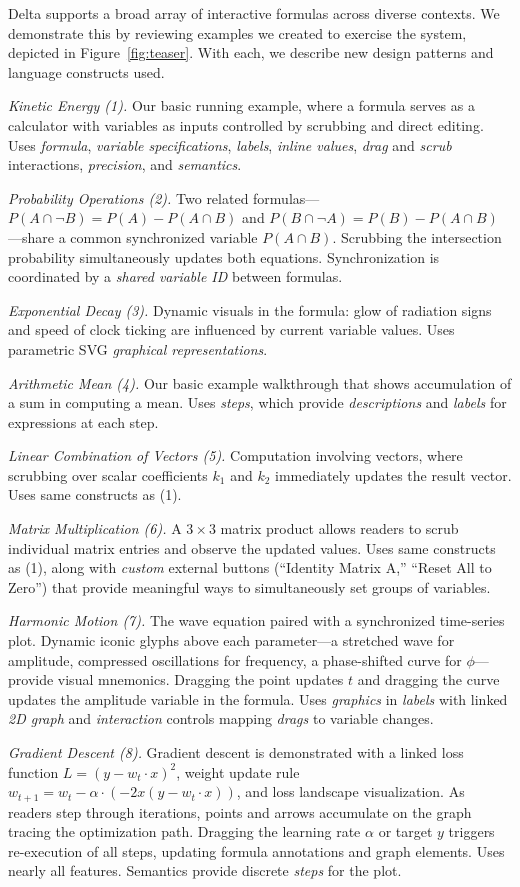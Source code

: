 Delta supports a broad array of interactive formulas across diverse contexts. We demonstrate this by reviewing examples we created to exercise the system, depicted in Figure~\ref{fig:teaser}. With each, we describe new design patterns and language constructs used.

\medskip

\emph{Kinetic Energy (1).} Our basic running example, where a formula serves as a calculator with variables as inputs controlled by scrubbing and direct editing. Uses \emph{formula}, \emph{variable specifications}, \emph{labels}, \emph{inline values}, \emph{drag} and \emph{scrub} interactions, \emph{precision}, and \emph{semantics}.

\emph{Probability Operations (2).} Two related formulas---$P(A \cap \neg B) = P(A) - P(A \cap B)$ and $P(B \cap \neg A) = P(B) - P(A \cap B)$---share a common synchronized variable $P(A \cap B)$. Scrubbing the intersection probability simultaneously updates both equations. Synchronization is coordinated by a \emph{shared variable ID} between formulas. 

\emph{Exponential Decay (3).} Dynamic visuals in the formula: glow of radiation signs and speed of clock ticking are influenced by current variable values. Uses parametric SVG \emph{graphical representations}.

\emph{Arithmetic Mean (4).} Our basic example walkthrough that shows accumulation of a sum in computing a mean. Uses \emph{steps}, which provide \emph{descriptions} and \emph{labels} for expressions at each step.

\emph{Linear Combination of Vectors (5).} Computation involving vectors, where scrubbing over scalar coefficients $k_1$ and $k_2$ immediately updates the result vector. Uses same constructs as (1).

\emph{Matrix Multiplication (6).} A $3 \times 3$ matrix product allows readers to scrub individual matrix entries and observe the updated values. Uses same constructs as (1), along with \emph{custom} external buttons (``Identity Matrix A,'' ``Reset All to Zero'') that provide meaningful ways to simultaneously set groups of variables.

\emph{Harmonic Motion (7).} The wave equation paired with a synchronized time-series plot. Dynamic iconic glyphs above each parameter---a stretched wave for amplitude, compressed oscillations for frequency, a phase-shifted curve for $\phi$---provide visual mnemonics. Dragging the point updates $t$ and dragging the curve updates the amplitude variable in the formula. Uses \emph{graphics} in \emph{labels} with linked \emph{2D graph} and \emph{interaction} controls mapping \emph{drags} to variable changes.

\emph{Gradient Descent (8).} Gradient descent is demonstrated with a linked loss function $L = (y - w_t \cdot x)^2$, weight update rule $w_{t+1} = w_t - \alpha \cdot (-2x(y - w_t \cdot x))$, and loss landscape visualization. As readers step through iterations, points and arrows accumulate on the graph tracing the optimization path. Dragging the learning rate $\alpha$ or target $y$ triggers re-execution of all steps, updating formula annotations and graph elements. Uses nearly all features. Semantics provide discrete \emph{steps} for the plot.

\medskip